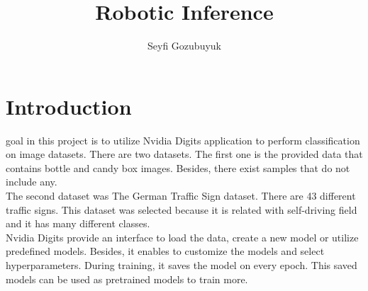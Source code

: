 \documentclass[10pt,journal,compsoc]{IEEEtran}
\begin{document}
\title{Robotic Inference}

\author{Seyfi Gozubuyuk}

%
{}


\maketitle
\IEEEdisplaynontitleabstractindextext
\IEEEpeerreviewmaketitle
\section{Introduction}
\label{sec:introduction}

 goal in this project is to utilize Nvidia Digits application to perform classification on image datasets. There are two datasets. The first one is the provided data that contains bottle and candy box images. Besides, there exist samples that do not include any.\\
The second dataset was The German Traffic Sign dataset\cite{tsign}. There are 43 different traffic signs. This dataset was selected because it is related with self-driving field and it has many different classes.\\
Nvidia Digits provide an interface to load the data, create a new model or utilize predefined models. Besides, it enables to customize the models and select hyperparameters. During training, it saves the model on every epoch. This saved models can be used as pretrained models to train more.
\end{document}
